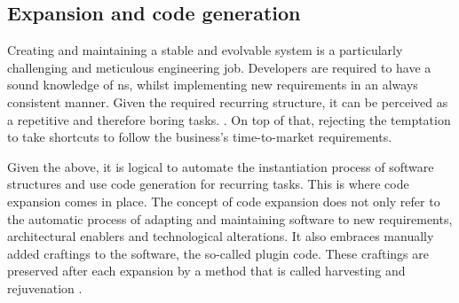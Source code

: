 \subsection{Expansion and code generation} \label{subsec:expansion}

Creating and maintaining a stable and evolvable system is a particularly challenging and
meticulous engineering job. Developers are required to have a sound knowledge of \gls{ns},
whilst implementing new requirements in an always consistent manner. Given the required
recurring structure, it can be perceived as a repetitive and therefore boring tasks.
\parencite[219]{mannaert_normalized_2016}. On top of that, rejecting the temptation to
take shortcuts to follow the business's time-to-market requirements.

Given the above, it is logical to automate the instantiation process of software
structures and use code generation for recurring
tasks\parencite[403]{mannaert_normalized_2016}. This is where code expansion comes in
place. The concept of code expansion does not only refer to the automatic process of
adapting and maintaining software to new requirements, architectural enablers and
technological alterations. It also embraces manually added craftings to the software, the
so-called plugin code. These craftings are preserved after each expansion by a method that
is called harvesting and rejuvenation \parencite[405-406]{mannaert_normalized_2016}.

